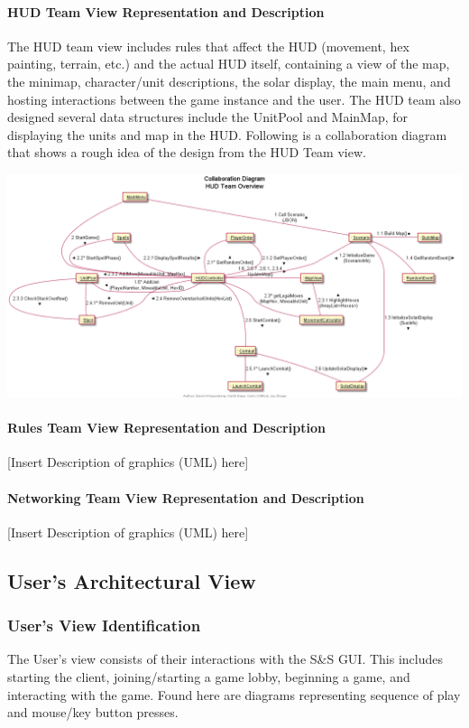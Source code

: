 \documentclass[12pt,a4paper,titlepage]{article}
\begin{document}
\paragraph{HUD Team View Representation and Description}
The HUD team view includes rules that affect the HUD (movement, hex painting, terrain, etc.) and the actual HUD itself, containing a view of the map, the minimap, character/unit descriptions, the solar display, the main menu, and hosting interactions between the game instance and the user. The HUD team also designed several data structures include the UnitPool and MainMap, for displaying the units and map in the HUD. Following is a collaboration diagram that shows a rough idea of the design from the HUD Team view.
\begin{center}
\includegraphics[width=\linewidth]{HUDTeamCollab.png}
\end{center}
\paragraph{Rules Team View Representation and Description}
[Insert Description of graphics (UML) here]
\paragraph{Networking Team View Representation and Description}
[Insert Description of graphics (UML) here]

\subsection{User's Architectural View}
	\subsubsection{User's View Identification}
	The User's view consists of their interactions with the S\&S GUI. This includes starting the client, joining/starting a game lobby, beginning a game, and interacting with the game. Found here are diagrams representing sequence of play and mouse/key button presses.
\end{document}
